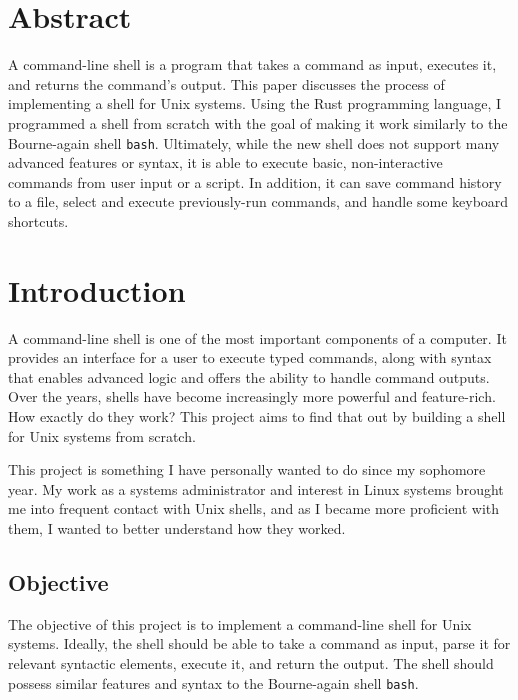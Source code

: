 \documentclass[12pt,twoside]{report} %
\begin{document}
	\chapter*{Abstract}
	A command-line shell is a program that takes a command as input, executes it, and returns the command’s output. This paper discusses the process of implementing a shell for Unix systems. Using the Rust programming language, I programmed a shell from scratch with the goal of making it work similarly to the Bourne-again shell \verb|bash|. Ultimately, while the new shell does not support many advanced features or syntax, it is able to execute basic, non-interactive commands from user input or a script. In addition, it can save command history to a file, select and execute previously-run commands, and handle some keyboard shortcuts.

	\afterpage{\blankpage{}}

	\chapter{Introduction}
	

    A command-line shell is one of the most important components of a computer. It provides an interface for a user to execute typed commands, along with syntax that enables advanced logic and offers the ability to handle command outputs. Over the years, shells have become increasingly more powerful and feature-rich. How exactly do they work? This project aims to find that out by building a shell for Unix systems from scratch.
    
    This project is something I have personally wanted to do since my sophomore year. My work as a systems administrator and interest in Linux systems brought me into frequent contact with Unix shells, and as I became more proficient with them, I wanted to better understand how they worked.

	\section{Objective}
    The objective of this project is to implement a command-line shell for Unix systems. Ideally, the shell should be able to take a command as input, parse it for relevant syntactic elements, execute it, and return the output. The shell should possess similar features and syntax to the Bourne-again shell \verb|bash|.
    
\end{document}
